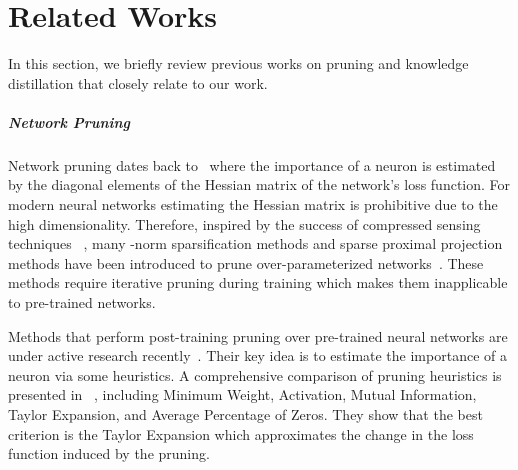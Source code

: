 \documentclass{article}
\begin{document}
\section{Related Works}
\label{sec:previous}

In this section, we briefly review previous works on pruning and knowledge distillation that closely relate to our work.
\subparagraph{Network Pruning}
Network pruning dates back to~\cite{braindamage} where the importance of a neuron is estimated by the diagonal elements of the Hessian matrix of the network's loss function. For modern neural networks estimating the Hessian matrix is prohibitive due to the high dimensionality. Therefore, inspired by the success of compressed sensing techniques ~\cite{donoho2006compressed}, many -norm sparsification methods and sparse proximal projection methods have been introduced to prune over-parameterized networks~\cite{conf/cvpr/LiuWFTP15,ding2019global,liu2017learning}. 
These methods require iterative pruning during training which makes them inapplicable to pre-trained networks. 

Methods that perform post-training pruning over pre-trained neural networks are under active research recently~\cite{NIPS2015_5784,PFEC,DBLP:conf/eccv/YangHCZGSSA18,NISP,DBLP:journals/corr/HuPTT16}. Their key idea is to estimate the importance of a neuron via some heuristics. A comprehensive comparison of pruning heuristics is presented in ~\cite{DBLP:conf/iclr/MolchanovTKAK17}, including Minimum  Weight, Activation, Mutual Information, Taylor Expansion, and Average Percentage of Zeros. They show that the best criterion is the Taylor Expansion which approximates the change in the loss function induced by the pruning. 
\end{document}

